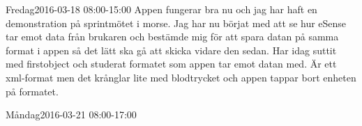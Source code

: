 \documentclass[a4paper,oneside]{book}
\begin{document}
\begin{diary}{Fredag}{2016-03-18 08:00-15:00}
	Appen fungerar bra nu och jag har haft en demonstration på sprintmötet i morse. Jag har nu börjat med att se hur eSense tar emot data från brukaren och bestämde mig för att spara datan på samma format i appen så det lätt ska gå att skicka vidare den sedan. Har idag suttit med firstobject och studerat formatet som appen tar emot datan med. Är ett xml-format men det krånglar lite med blodtrycket och appen tappar bort enheten på formatet.
\end{diary}
\newpage

\begin{diary}{Måndag}{2016-03-21 08:00-17:00}

\end{diary}
\end{document}
